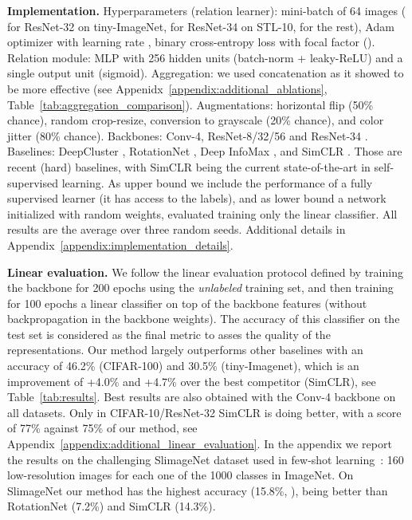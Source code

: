 \documentclass{article}
\begin{document}
\textbf{Implementation.} Hyperparameters (relation learner): mini-batch of 64 images ( for ResNet-32 on tiny-ImageNet,  for ResNet-34 on STL-10,  for the rest), Adam optimizer with learning rate , binary cross-entropy loss with focal factor (). Relation module: MLP with 256 hidden units (batch-norm + leaky-ReLU) and a single output unit (sigmoid). Aggregation: we used concatenation as it showed to be more effective (see Appenidx~\ref{appendix:additional_ablations}, Table~\ref{tab:aggregation_comparison}). Augmentations: horizontal flip (50\% chance), random crop-resize, conversion to grayscale (20\% chance), and color jitter (80\% chance). Backbones: Conv-4, ResNet-8/32/56 and ResNet-34 \citep{he2016deep}.
Baselines: DeepCluster \citep{caron2018deep}, RotationNet \citep{gidaris2018unsupervised}, Deep InfoMax \citep{hjelm2018learning}, and SimCLR \citep{chen2020simple}. Those are recent (hard) baselines, with SimCLR being the current state-of-the-art in self-supervised learning. As upper bound we include the performance of a fully supervised learner (it has access to the labels), and as lower bound a network initialized with random weights, evaluated training only the linear classifier.
All results are the average over three random seeds. Additional details in Appendix~\ref{appendix:implementation_details}.

\textbf{Linear evaluation.} We follow the linear evaluation protocol defined by \cite{kolesnikov2019revisiting} training the backbone for 200 epochs using the \emph{unlabeled} training set, and then training for 100 epochs a linear classifier on top of the backbone features (without backpropagation in the backbone weights). The accuracy of this classifier on the test set is considered as the final metric to asses the quality of the representations. Our method largely outperforms other baselines with an accuracy of 46.2\% (CIFAR-100) and 30.5\% (tiny-Imagenet), which is an improvement of +4.0\% and +4.7\% over the best competitor (SimCLR), see Table~\ref{tab:results}. Best results are also obtained with the Conv-4 backbone on all datasets. Only in CIFAR-10/ResNet-32 SimCLR is doing better, with a score of 77\% against 75\% of our method, see  Appendix~\ref{appendix:additional_linear_evaluation}. In the appendix we report the results on the challenging SlimageNet dataset used in few-shot learning~\citep{antoniou2020defining}: 160 low-resolution images for each one of the 1000 classes in ImageNet. On SlimageNet our method has the highest accuracy (15.8\%, ), being better than RotationNet (7.2\%) and SimCLR (14.3\%).
\end{document}

